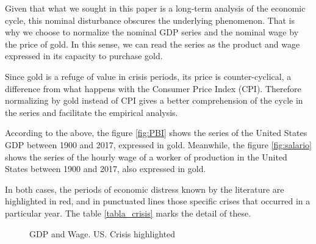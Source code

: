 \documentclass[a4paper,10cpi]{article}
\begin{document}
	Given that what we sought in this paper is a long-term analysis of the economic cycle, this nominal disturbance obscures the underlying phenomenon. That is why we choose to normalize the nominal GDP series and the nominal wage by the price of gold. In this sense, we can read the series as the product and wage expressed in its capacity to purchase gold.
	
	
	Since gold is a refuge of value in crisis periods, its price is counter-cyclical, a difference from what happens with the Consumer Price Index (CPI). Therefore normalizing by gold instead of CPI gives a better comprehension of the cycle in the series and facilitate the empirical analysis.
	
	According to the above, the figure \ref{fig:PBI} shows the series of the United States GDP between 1900 and 2017, expressed in gold. Meanwhile, the figure \ref{fig:salario} shows the series of the hourly wage of a worker of production in the United States between 1900 and 2017, also expressed in gold.
	
	In both cases, the periods of economic distress known by the literature are highlighted in red, and in punctuated lines those specific crises that occurred in a particular year. The table \ref{tabla_crisis} marks the detail of these.
	
	
	\begin{figure}[H]
		\centering
		\caption{GDP and Wage. US. Crisis highlighted} \label{fig:series_crisis}
	\end{figure}
	
\end{document}
